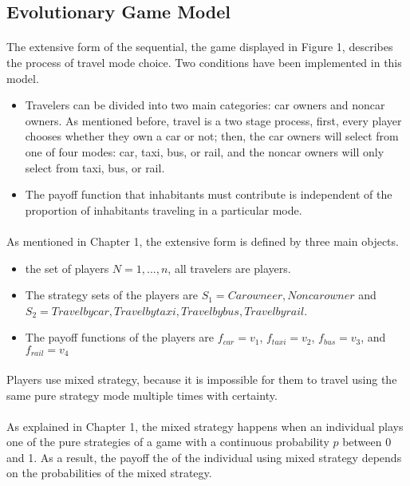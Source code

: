 \subsection{Evolutionary Game Model}
\paragraph{} The extensive form of the sequential, the game displayed in Figure 1, describes the process of travel mode choice. Two conditions have been implemented in this model.
\begin{itemize}
\item Travelers can be divided into two main categories: car owners and noncar owners. As mentioned before, travel is a two stage process, first, every player chooses whether they own a car or not; then, the car owners will select from one of four modes: car, taxi, bus, or rail, and the noncar owners will only select from taxi, bus, or rail.
\item The payoff function that inhabitants must contribute is independent of the proportion of inhabitants traveling in a particular mode.

\end{itemize}
\paragraph{} As mentioned in Chapter 1, the extensive form is defined by three  main objects.
\begin{itemize}
\item the set of players $N = {1,...,n}$, all travelers are players.
\item The strategy sets of the players are $S_1 = {Car owneer, Noncar owner}$ and ${S_2 = {Travel by car, Travel by taxi, Travel by bus, Travel by rail}}$.
\item The payoff functions of the players are $f_{car} = v_1$, $f_{taxi} = v_2$, $f_{bus} = v_3$, and $f_{rail} = v_4$
\end{itemize}
\paragraph{}Players use mixed strategy, because it is impossible for them to travel using the same pure strategy mode multiple times with certainty.
\paragraph{}As explained in Chapter 1, the mixed strategy happens when an individual plays one of the pure strategies of a game with a continuous probability $p$ between 0 and 1. As a result, the payoff the of the individual using mixed strategy depends on the probabilities of the mixed strategy.
